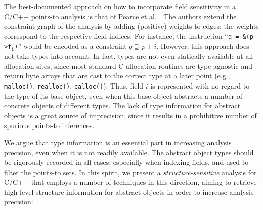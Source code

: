 \documentclass{llncs}
\newcommand{\code}[1]{\texttt{#1}}
\begin{document}
The best-documented approach on how to incorporate
field sensitivity in a C/C++ points-to analysis is that of Pearce et
al. \cite{paste/PearceKH04,toplas/PearceKH07}. The authors extend the
constraint-graph of the analysis by adding (positive) weights to 
edges; the weights correspond to the respective field indices. For
instance, the instruction ``\code{q = \&(p->f$_{\code{i}}$)}'' would
be encoded as a constraint $q \supseteq p + i$. However, this approach
does not take types into account. In fact, types are not even
statically available at all allocation sites, since most standard C
allocation routines are type-agnostic and return byte arrays that are
cast to the correct type at a later point (e.g., \code{malloc()},
\code{realloc()}, \code{calloc()}).  Thus, field $i$ is represented
with no regard to the type of its base object, even when this base
object abstracts a number of concrete objects of different types.
The lack of type information for abstract objects is a great source of
imprecision, since it results in a prohibitive number of spurious
points-to inferences.

We argue that type information is an essential part in increasing
analysis precision, even when it is not readily available. The
abstract object types should be rigorously recorded in all cases,
especially when indexing fields, and used to filter the points-to
sets. In this spirit, we present a \emph{structure-sensitive} analysis
for C/C++ that employs a number of techniques in this direction,
aiming to retrieve high-level structure information for abstract
objects in order to increase analysis precision:
\end{document}

